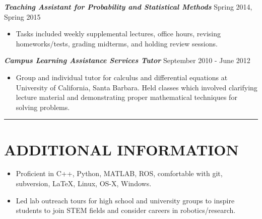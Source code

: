 \documentclass{res}
\begin{document}
\begin{resume}
\begin{itemize}
\end{itemize}
\vspace*{-1ex}
{\sl \bf Teaching Assistant for Probability and Statistical Methods} \hfill Spring 2014, Spring 2015
\vspace*{.5ex}
\begin{itemize}
\item Tasks included weekly supplemental lectures, office hours, revising homeworks/tests, grading midterms, and holding review sessions.
\end{itemize}
\vspace*{-1ex}
{\sl \bf Campus Learning Assistance Services Tutor} \hfill September 2010 - June 2012
\vspace*{.5ex}
\begin{itemize}
\item Group and individual tutor for calculus and differential equations at University of California, Santa Barbara. Held classes which involved clarifying lecture material and demonstrating proper mathematical techniques for solving problems.
\end{itemize}
\vspace*{0ex}
 \vspace*{-3ex}
\hspace{-8.5ex}\rule{16.5cm}{0.4pt}
 \vspace*{-3ex}

\section{ADDITIONAL INFORMATION}
\vspace{3ex}
\begin{itemize}
\item Proficient in C++, Python, MATLAB, ROS, comfortable with git, subversion, LaTeX, Linux, OS-X, Windows.
\item Led lab outreach tours for high school and university groups to inspire students to join STEM fields and consider careers in robotics/research.
\end{itemize}



\end{resume}
\end{document}

